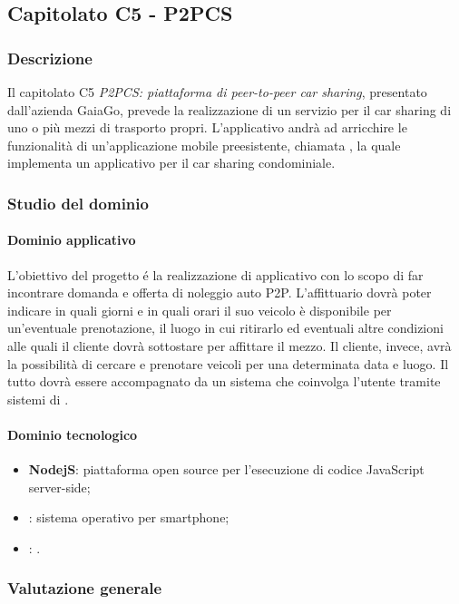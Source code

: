 	\subsection{Capitolato C5 - P2PCS}
\subsubsection{Descrizione}
Il capitolato C5 \emph{P2PCS: piattaforma di peer-to-peer car sharing}, presentato dall'azienda GaiaGo, prevede la realizzazione di un servizio per il car sharing  di uno o più mezzi di trasporto propri. L'applicativo andrà ad arricchire le funzionalità di un'applicazione mobile preesistente, chiamata , la quale implementa un applicativo per il car sharing condominiale.
\subsubsection{Studio del dominio}
\paragraph{Dominio applicativo} \Spazio
L'obiettivo del progetto é la realizzazione di applicativo con lo scopo di far incontrare domanda e offerta di noleggio auto P2P. L'affittuario dovrà poter indicare in quali giorni e in quali orari il suo veicolo è disponibile per un'eventuale prenotazione, il luogo in cui ritirarlo ed eventuali altre condizioni alle quali il cliente dovrà sottostare per affittare il mezzo. Il cliente, invece, avrà la possibilità di cercare e prenotare veicoli per una determinata data e luogo. Il tutto dovrà essere accompagnato da un sistema che coinvolga l'utente tramite sistemi di .
\paragraph{Dominio tecnologico} 
\begin{itemize}
	\item  \textbf{NodejS}: piattaforma open source per l'esecuzione di codice JavaScript server-side;
	\item \textbf{}: sistema operativo per smartphone;
	\item \textbf{}: .
\end{itemize}
\pagebreak
\subsubsection{Valutazione generale}
